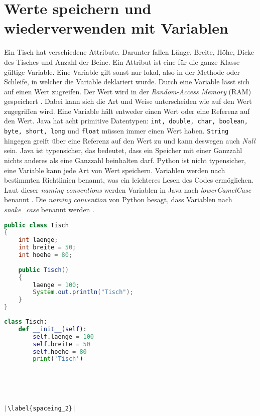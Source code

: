 \section{Werte speichern und wiederverwenden mit Variablen}\label{wsuwmv}
Ein Tisch hat verschiedene Attribute. Darunter fallen Länge, Breite, Höhe, Dicke des Tisches und Anzahl der Beine. Ein Attribut ist eine für die ganze Klasse gültige Variable. Eine Variable gilt sonst nur lokal, also in der Methode oder Schleife, in welcher die Variable deklariert wurde. Durch eine Variable lässt sich auf einen Wert zugreifen. Der Wert wird in der \textit{Random-Access Memory} (RAM) gespeichert \cite{Louis:2010}. Dabei kann sich die Art und Weise unterscheiden wie auf den Wert zugegriffen wird. Eine Variable hält entweder einen Wert oder eine Referenz auf den Wert. Java hat acht primitive Datentypen: \texttt{int, double, char, boolean, byte, short, long} und \texttt{float} müssen immer einen Wert haben. \texttt{String} hingegen greift über eine Referenz auf den Wert zu und kann deswegen auch \textit{Null} sein. Java ist typensicher, das bedeutet, dass ein Speicher mit einer Ganzzahl nichts anderes als eine Ganzzahl beinhalten darf. Python ist nicht typensicher, eine Variable kann jede Art von Wert speichern. Variablen werden nach bestimmten Richtlinien benannt, was ein leichteres Lesen des Codes ermöglichen. Laut dieser \textit{naming conventions} werden Variablen in Java nach \textit{lowerCamelCase} benannt \cite{Microsoft:CapCon}. Die \textit{naming convention} von Python besagt, dass Variablen nach \textit{snake\_case} benannt werden \cite{Ims:h-s}. \cite{JavaNC}\cite{PythonStyle}\cite{JVMS}

\begin{minipage}{.5\linewidth}
\begin{lstlisting}[language=java,caption={Attribute/Variablen in Java},captionpos=b,label={lst:java:variablen},frame=none,escapechar=|]
public class Tisch
{
    int laenge;
    int breite = 50;
    int hoehe = 80;
    
    public Tisch()
    {
        laenge = 100;
        System.out.println("Tisch");
    }
}
\end{lstlisting}
\end{minipage}
\begin{minipage}{.5\linewidth}
\begin{lstlisting}[language=python,caption={Attribute/Variablen in Python},captionpos=b,label={lst:python:variablen},frame=l,escapechar=|]
class Tisch:
    def __init__(self):
        self.laenge = 100
        self.breite = 50
        self.hoehe = 80
        print('Tisch')





|\label{spaceing_2}|
\end{lstlisting}
\end{minipage}

